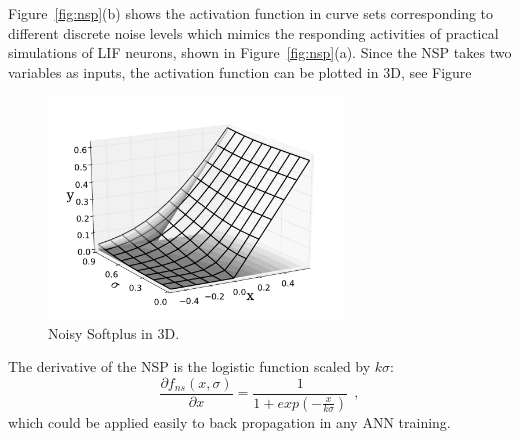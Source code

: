 	Figure~\ref{fig:nsp}(b) shows the activation function in curve sets corresponding to different discrete noise levels which mimics the responding activities of practical simulations of LIF neurons, shown in Figure~\ref{fig:nsp}(a).
	Since the NSP takes two variables as inputs, the activation function can be plotted in 3D, see Figure
	
	\begin{figure}[bt]
		\centering
		\includegraphics[width=0.7\textwidth]{pics_iconip/5.pdf}
		\caption{Noisy Softplus in 3D.}
		\label{Fig:NSP3D}
	\end{figure}

	The derivative of the NSP is the logistic function scaled by $k\sigma$:
	\begin{equation}
	\frac{\partial f_{ns}(x,\sigma)}{\partial x} = \frac{1}{1+exp(-\frac{x}{k\sigma})}~~,
	\label{equ:logist}
	\end{equation}	
	which could be applied easily to back propagation in any ANN training.	
	
	
